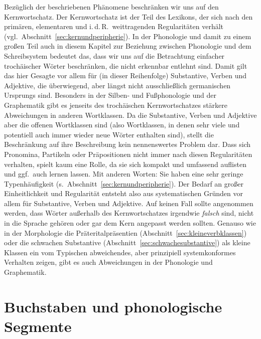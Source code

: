 Bezüglich der beschriebenen Phänomene beschränken wir uns auf den Kernwortschatz.
Der Kernwortschatz ist der Teil des Lexikons, der sich nach den primären, elementaren und i.\,d.\,R.\ weittragenden Regularitäten verhält (vgl.\ Abschnitt~\ref{sec:kernundperipherie}).
In der Phonologie und damit zu einem großen Teil auch in diesem Kapitel zur Beziehung zwischen Phonologie und dem Schreibsystem bedeutet das, dass wir uns auf die Betrachtung einfacher trochäischer Wörter beschränken, die nicht erkennbar entlehnt sind.
Damit gilt das hier Gesagte vor allem für (in dieser Reihenfolge) Substantive, Verben und Adjektive, die überwiegend, aber längst nicht ausschließlich germanischen Ursprungs sind.
Besonders in der Silben- und Fußphonologie und der Graphematik gibt es jenseits des trochäischen Kernwortschatzes stärkere Abweichungen in anderen Wortklassen.
Da die Substantive, Verben und Adjektive aber die offenen Wortklassen sind (also Wortklassen, in denen sehr viele und potentiell auch immer wieder neue Wörter enthalten sind), stellt die Beschränkung auf ihre Beschreibung kein nennenswertes Problem dar.
Dass sich Pronomina, Partikeln oder Präpositionen nicht immer nach diesen Regularitäten verhalten, spielt kaum eine Rolle, da sie sich kompakt und umfassend auflisten und ggf.\ auch lernen lassen.
Mit anderen Worten:
Sie haben eine sehr geringe Typenhäufigkeit (s.\ Abschnitt~\ref{sec:kernundperipherie}).
Der Bedarf an großer Einheitlichkeit und Regularität entsteht also aus systematischen Gründen vor allem für Substantive, Verben und Adjektive.
Auf keinen Fall sollte angenommen werden, dass Wörter außerhalb des Kernwortschatzes irgendwie \textit{falsch} sind, nicht in die Sprache gehören oder gar dem Kern angepasst werden sollten.
Genauso wie in der Morphologie die Präteritalpräsentien (Abschnitt~\ref{sec:kleineverbklassen}) oder die schwachen Substantive (Abschnitt~\ref{sec:schwachesubstantive}) als kleine Klassen ein vom Typischen abweichendes, aber prinzipiell systemkonformes Verhalten zeigen, gibt es auch Abweichungen in der Phonologie und Graphematik.


\section{Buchstaben und phonologische Segmente}
\label{sec:buchstabenundphonologischesegmente}

